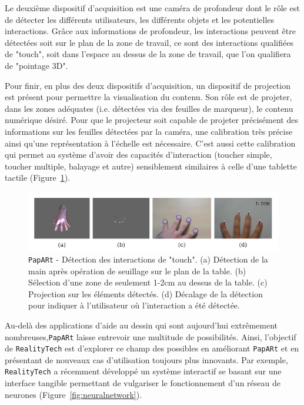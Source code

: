 Le deuxième dispositif d'acquisition est une caméra de profondeur dont le rôle est de détecter les différents utilisateurs, les différents objets et les potentielles interactions. Grâce aux informations de profondeur, les interactions peuvent être détectées soit sur le plan de la zone de travail, ce sont des interactions qualifiées de "touch", soit dans l'espace au dessus de la zone de travail, que l'on qualifiera de "pointage 3D".

Pour finir, en plus des deux dispositifs d'acquisition, un dispositif de projection est présent pour permettre la visualisation du contenu. Son rôle est de projeter, dans les zones adéquates (i.e. détectées via des feuilles de marqueur), le contenu numérique désiré. Pour que le projecteur soit capable de projeter précisément des informations sur les feuilles détectées par la caméra, une calibration très précise ainsi qu'une représentation à l'échelle est nécessaire. C'est aussi cette calibration qui permet au système d'avoir des capacités d'interaction (toucher simple, toucher multiple, balayage et autre) sensiblement similaires à celle d'une tablette tactile (Figure~\ref{fig:papart:touch}).


\begin{figure}[H]
\centering
\includegraphics[width=\linewidth]{images/paparttouch}
\caption{\texttt{PapARt} - Détection des interactions de "touch". (a) Détection de la main après opération de seuillage sur le plan de la table. (b) Sélection d'une zone de seulement 1-2cm au dessus de la table. (c) Projection sur les éléments détectés. (d) Décalage de la détection pour indiquer à l'utilisateur où l'interaction a été détectée.\protect\footnotemark}
\label{fig:papart:touch}
\end{figure}


Au-delà des applications d'aide au dessin qui sont aujourd'hui extrêmement nombreuses,\texttt{PapARt} laisse entrevoir une multitude de possibilités. Ainsi, l'objectif de \texttt{RealityTech} est d'explorer ce champ des possibles en améliorant \texttt{PapARt} et en présentant de nouveaux cas d'utilisation toujours plus innovants. Par exemple, \texttt{RealityTech} a récemment développé un système interactif se basant sur une interface tangible permettant de vulgariser le fonctionnement d'un réseau de neurones (Figure~\ref{fig:neuralnetwork}).

